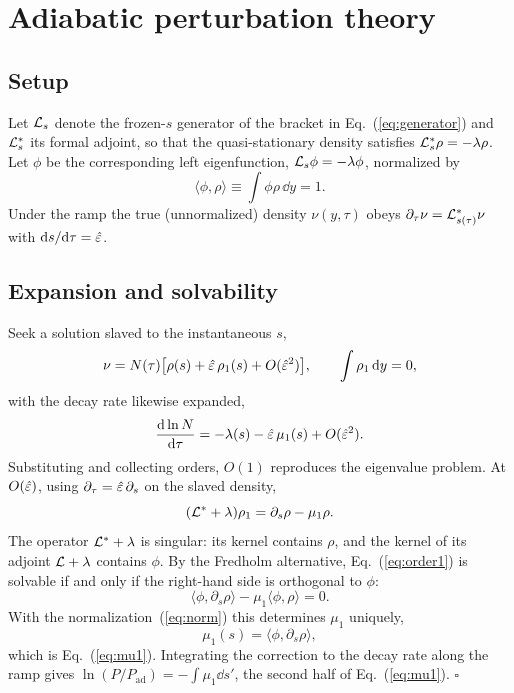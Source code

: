 \section{\label{app:lag}Adiabatic perturbation theory}

\subsection{Setup}

Let $\mathcal{L}_s$ denote the frozen-$s$ generator of the bracket in Eq.~(\ref{eq:generator}) and $\mathcal{L}^\ast_s$ its formal adjoint, so that the quasi-stationary density satisfies $\mathcal{L}^\ast_s\rho=-\lambda\rho$.  Let $\phi$ be the corresponding left eigenfunction, $\mathcal{L}_s\phi=-\lambda\phi$, normalized by
\begin{equation}
\label{eq:norm}
\langle\phi,\rho\rangle\equiv\int\phi\rho\,\dd y=1 .
\end{equation}
Under the ramp the true (unnormalized) density $\nu(y,\tau)$ obeys $\partial_\tau\nu=\mathcal{L}^\ast_{s(\tau)}\nu$ with $\mathrm{d} s/\mathrm{d}\tau=\hat\varepsilon$.

\subsection{Expansion and solvability}

Seek a solution slaved to the instantaneous $s$,
\begin{equation}
\nu=N(\tau)\bigl[\rho(s)+\hat\varepsilon\,\rho_1(s)+O(\hat\varepsilon^2)\bigr],
\qquad \int\rho_1\,\mathrm{d} y=0,
\end{equation}
with the decay rate likewise expanded,
\begin{equation}
\frac{\mathrm{d}\ln N}{\mathrm{d}\tau}=-\lambda(s)-\hat\varepsilon\,\mu_1(s)+O(\hat\varepsilon^2).
\end{equation}
Substituting and collecting orders, $O(1)$ reproduces the eigenvalue problem.  At $O(\hat\varepsilon)$, using $\partial_\tau=\hat\varepsilon\,\partial_s$ on the slaved density,
\begin{equation}
\label{eq:order1}
(\mathcal{L}^\ast+\lambda)\rho_1=\partial_s\rho-\mu_1\rho .
\end{equation}
The operator $\mathcal{L}^\ast+\lambda$ is singular: its kernel contains $\rho$, and the kernel of its adjoint $\mathcal{L}+\lambda$ contains $\phi$.  By the Fredholm alternative, Eq.~(\ref{eq:order1}) is solvable if and only if the right-hand side is orthogonal to $\phi$:
\begin{equation}
\langle\phi,\partial_s\rho\rangle-\mu_1\langle\phi,\rho\rangle=0 .
\end{equation}
With the normalization~(\ref{eq:norm}) this determines $\mu_1$ uniquely,
\begin{equation}
\mu_1(s)=\langle\phi,\partial_s\rho\rangle,
\end{equation}
which is Eq.~(\ref{eq:mu1}).  Integrating the correction to the decay rate along the ramp gives
$\ln(P/P_{\mathrm{ad}})=-\int\mu_1\dd s'$, the second half of Eq.~(\ref{eq:mu1}).  $\square$

